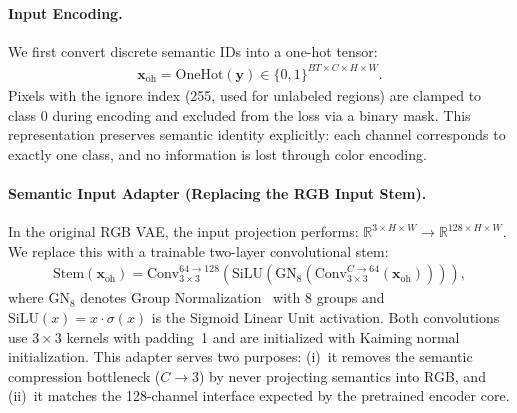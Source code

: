 \paragraph{Input Encoding.}
We first convert discrete semantic IDs into a one-hot tensor:
\begin{align}
    \mathbf{x}_{\text{oh}} = \text{OneHot}(\mathbf{y}) \in \{0, 1\}^{BT \times C \times H \times W}.
    \label{eq:onehot}
\end{align}
Pixels with the ignore index (255, used for unlabeled regions) are clamped to class 0 during encoding and excluded from the loss via a binary mask. This representation preserves semantic identity explicitly: each channel corresponds to exactly one class, and no information is lost through color encoding.

\paragraph{Semantic Input Adapter (Replacing the RGB Input Stem).}
In the original RGB VAE, the input projection performs:
$\mathbb{R}^{3 \times H \times W} \rightarrow \mathbb{R}^{128 \times H \times W}.$
We replace this with a trainable two-layer convolutional stem:
\begin{align}
    \text{Stem}(\mathbf{x}_{\text{oh}}) = \text{Conv}_{3 \times 3}^{64 \rightarrow 128}\!\left(\text{SiLU}\!\left(\text{GN}_8\!\left(\text{Conv}_{3 \times 3}^{C \rightarrow 64}(\mathbf{x}_{\text{oh}})\right)\right)\right),
    \label{eq:stem}
\end{align}
where $\text{GN}_8$ denotes Group Normalization~\cite{wu2018group} with 8 groups and $\text{SiLU}(x) = x \cdot \sigma(x)$ is the Sigmoid Linear Unit activation. Both convolutions use $3 \times 3$ kernels with padding~1 and are initialized with Kaiming normal initialization. This adapter serves two purposes: (i)~it removes the semantic compression bottleneck ($C \rightarrow 3$) by never projecting semantics into RGB, and (ii)~it matches the 128-channel interface expected by the pretrained encoder core.

